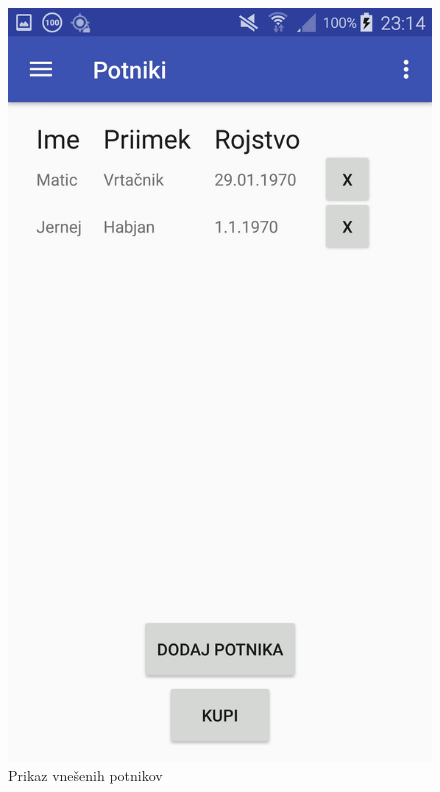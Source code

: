 \documentclass[11pt,a4paper]{article}
\begin{document}
\begin{figure}[htb]
	\centerline{\includegraphics[width=1.0\textwidth]{GUI/Potniki.jpg}}
	\caption{Prikaz vnešenih potnikov}
	\label{sl:koncept}
\end{figure}
\end{document}
